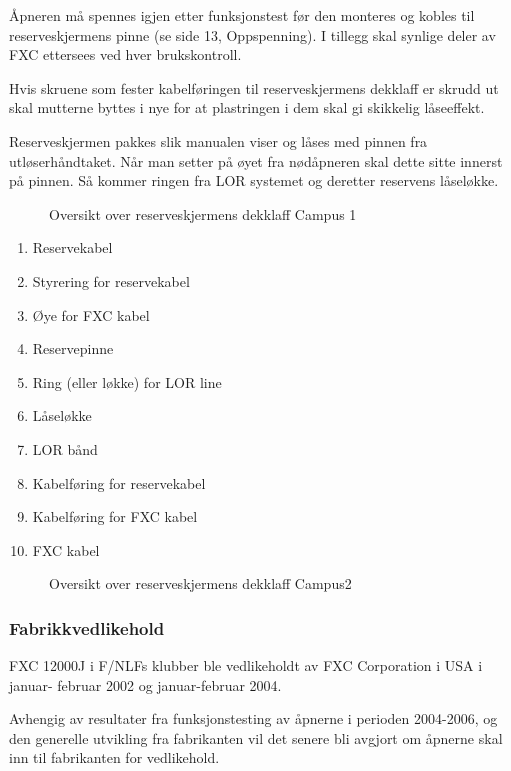 Åpneren må spennes igjen etter funksjonstest før den monteres og kobles til reserveskjermens pinne (se side 13, Oppspenning). I tillegg skal synlige deler av FXC ettersees ved hver brukskontroll.

Hvis skruene som fester kabelføringen til reserveskjermens dekklaff er skrudd ut skal mutterne byttes i nye for at plastringen i dem skal gi skikkelig låseeffekt.

Reserveskjermen pakkes slik manualen viser og låses med pinnen fra utløserhåndtaket. Når man setter på øyet fra nødåpneren skal dette sitte innerst på pinnen. Så kommer ringen fra LOR systemet og deretter reservens låseløkke.

\begin{figure}
	\caption{Oversikt over reserveskjermens dekklaff Campus 1}
\end{figure}

\begin{enumerate}
\item Reservekabel
\item Styrering for reservekabel
\item Øye for FXC kabel
\item Reservepinne
\item Ring (eller løkke) for LOR line
\item Låseløkke
\item LOR bånd
\item Kabelføring for reservekabel
\item Kabelføring for FXC kabel
\item FXC kabel
\end{enumerate}

\begin{figure}
	\caption{Oversikt over reserveskjermens dekklaff Campus2}
\end{figure}

\subsubsection{Fabrikkvedlikehold}
FXC 12000J i F/NLFs klubber ble vedlikeholdt av FXC Corporation i USA i januar- februar 2002 og januar-februar 2004.

Avhengig av resultater fra funksjonstesting av åpnerne i perioden 2004-2006, og den generelle utvikling fra fabrikanten vil det senere bli avgjort om åpnerne skal inn til fabrikanten for vedlikehold.

